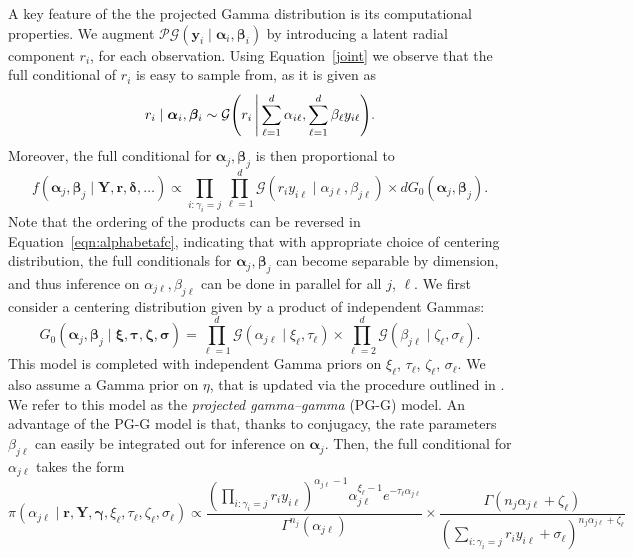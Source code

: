 A key feature of the the projected Gamma distribution is its computational properties. We augment 
$\mathcal{PG}(\bm{y}_i\mid\bm{\alpha}_i,\bm{\beta}_i) $ by introducing a latent radial component $r_i$, 
for each observation. Using Equation~\eqref{joint} we observe that the 
full conditional of $r_i$ is easy to sample from, as it is given as
\begin{equation}
    r_i\mid\bm{\alpha}_i,\bm{\beta}_i \sim \mathcal{G}\left(r_i \bigmid \sum_{\ell = 1}^d\alpha_{i\ell}, \sum_{\ell = 1}^d\beta_{\ell} y_{i\ell}\right).
\end{equation}
Moreover,  the full conditional for $\bm{\alpha}_j,\bm{\beta}_j$ is then proportional to
\begin{equation}
    \label{eqn:alphabetafc}
    f(\bm{\alpha}_j,\bm{\beta}_j\mid \bm{Y},\bm{r},\bm{\delta},\ldots)
    \propto \prod_{i:\gamma_i = j}\prod_{\ell = 1}^d\mathcal{G}\left(r_iy_{i\ell}\mid\alpha_{j\ell},\beta_{j\ell}\right)
    \times dG_0(\bm{\alpha}_j,\bm{\beta}_j).
\end{equation}
Note that the ordering of the products can be reversed in Equation~\eqref{eqn:alphabetafc}, 
indicating that with appropriate choice of centering distribution, the full conditionals 
for $\bm{\alpha}_j,\bm{\beta}_j$ can become separable by dimension, and thus inference on
$\alpha_{j\ell},\beta_{j\ell}$ can be done in parallel for all $j$, $\ell$.
We first consider a centering distribution given by a product of independent Gammas:
\begin{equation}
    G_0(\bm{\alpha}_j,\bm{\beta}_j\mid \bm{\xi},\bm{\tau},\bm{\zeta},\bm{\sigma})
    = \prod_{\ell = 1}^d\mathcal{G}(\alpha_{j\ell}\mid \xi_{\ell},\tau_{\ell})\times\prod_{\ell = 2}^d\mathcal{G}(\beta_{j\ell}\mid\zeta_{\ell},\sigma_{\ell}).
\end{equation}
This model is completed with independent Gamma priors on $\xi_{\ell}$, $\tau_{\ell}$, $\zeta_{\ell}$, $\sigma_{\ell}$.  
We also assume a Gamma prior on $\eta$, that is updated via the procedure outlined in \cite{escobar1995}.  
We refer to this model as the \emph{projected gamma--gamma} (PG-G) model.  An advantage of the PG-G model 
is that, thanks to conjugacy, the rate parameters $\beta_{j\ell}$ can easily be integrated out for inference 
on $\bm{\alpha}_j$.  Then, the full conditional for $\alpha_{j\ell}$ takes the form
\begin{equation}
    \label{eqn:alphalupdate}
    \pi(\alpha_{j\ell}\mid \bm{r},\bm{Y},\bm{\gamma},\xi_\ell,\tau_\ell,\zeta_\ell,\sigma_\ell)
    \propto \frac{\left(\prod_{i:\gamma_i = j}r_iy_{i\ell}\right)^{\alpha_{j\ell} - 1}\alpha_{j\ell}^{\xi_\ell - 1}e^{-\tau_\ell \alpha_{j\ell}}}{\Gamma^{n_j}(\alpha_{j\ell})}\times \frac{\Gamma\left(n_j\alpha_{j\ell} + \zeta_{\ell}\right)}{\left(\sum_{i:\gamma_i = j}r_iy_{i\ell} + \sigma_{\ell}\right)^{n_j\alpha_{j\ell} + \zeta_{\ell}}}
\end{equation}
